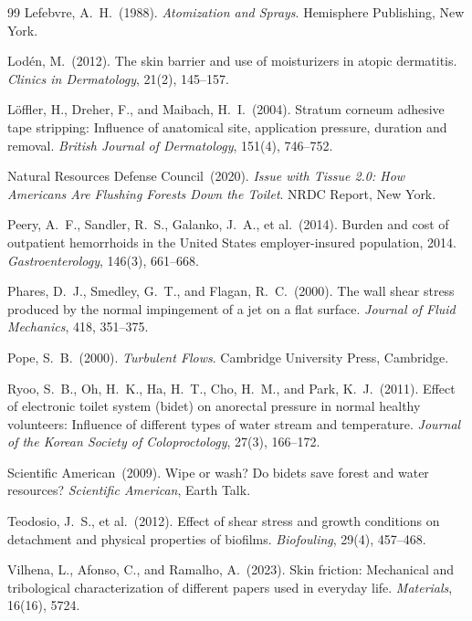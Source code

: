 \documentclass[aps,prfluids,reprint,amsmath,amssymb,floatfix]{revtex4-2}
\begin{document}
\begin{thebibliography}{99}
Lefebvre, A.~H.\ (1988).
\textit{Atomization and Sprays}.
Hemisphere Publishing, New York.

Lod\'{e}n, M.\ (2012).
The skin barrier and use of moisturizers in atopic dermatitis.
\textit{Clinics in Dermatology}, 21(2), 145--157.

L\"{o}ffler, H., Dreher, F., and Maibach, H.~I.\ (2004).
Stratum corneum adhesive tape stripping: Influence of anatomical site,
application pressure, duration and removal.
\textit{British Journal of Dermatology}, 151(4), 746--752.

Natural Resources Defense Council\ (2020).
\textit{Issue with Tissue 2.0: How Americans Are Flushing Forests Down
the Toilet}.
NRDC Report, New York.

Peery, A.~F., Sandler, R.~S., Galanko, J.~A., et al.\ (2014).
Burden and cost of outpatient hemorrhoids in the United States
employer-insured population, 2014.
\textit{Gastroenterology}, 146(3), 661--668.

Phares, D.~J., Smedley, G.~T., and Flagan, R.~C.\ (2000).
The wall shear stress produced by the normal impingement of a jet on a flat
surface.
\textit{Journal of Fluid Mechanics}, 418, 351--375.

Pope, S.~B.\ (2000).
\textit{Turbulent Flows}.
Cambridge University Press, Cambridge.

Ryoo, S.~B., Oh, H.~K., Ha, H.~T., Cho, H.~M., and Park, K.~J.\ (2011).
Effect of electronic toilet system (bidet) on anorectal pressure in normal
healthy volunteers: Influence of different types of water stream and
temperature.
\textit{Journal of the Korean Society of Coloproctology}, 27(3), 166--172.

Scientific American\ (2009).
Wipe or wash? Do bidets save forest and water resources?
\textit{Scientific American}, Earth Talk.

Teodosio, J.~S., et al.\ (2012).
Effect of shear stress and growth conditions on detachment and physical
properties of biofilms.
\textit{Biofouling}, 29(4), 457--468.

Vilhena, L., Afonso, C., and Ramalho, A.\ (2023).
Skin friction: Mechanical and tribological characterization of different
papers used in everyday life.
\textit{Materials}, 16(16), 5724.


\end{thebibliography}
\end{document}
